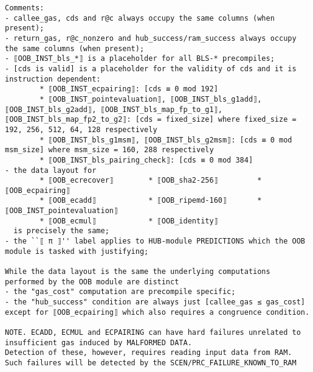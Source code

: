 \documentclass[varwidth=\maxdimen,margin=0.5cm,multi={verbatim}]{standalone}
\begin{document}
\begin{verbatim}
Comments: 
- callee_gas, cds and r@c always occupy the same columns (when present);
- return_gas, r@c_nonzero and hub_success/ram_success always occupy the same columns (when present);
- ⟦OOB_INST_bls_*⟧ is a placeholder for all BLS-* precompiles;
- [cds is valid] is a placeholder for the validity of cds and it is instruction dependent:
        * ⟦OOB_INST_ecpairing⟧: [cds ≡ 0 mod 192]
        * ⟦OOB_INST_pointevaluation⟧, ⟦OOB_INST_bls_g1add⟧, ⟦OOB_INST_bls_g2add⟧, ⟦OOB_INST_bls_map_fp_to_g1⟧, ⟦OOB_INST_bls_map_fp2_to_g2⟧: [cds = fixed_size] where fixed_size = 192, 256, 512, 64, 128 respectively  
        * ⟦OOB_INST_bls_g1msm⟧, ⟦OOB_INST_bls_g2msm⟧: [cds ≡ 0 mod msm_size] where msm_size = 160, 288 respectively
        * ⟦OOB_INST_bls_pairing_check⟧: [cds ≡ 0 mod 384]
- the data layout for
        * ⟦OOB_ecrecover⟧        * ⟦OOB_sha2-256⟧         * ⟦OOB_ecpairing⟧
        * ⟦OOB_ecadd⟧            * ⟦OOB_ripemd-160⟧       * ⟦OOB_INST_pointevaluation⟧           
        * ⟦OOB_ecmul⟧            * ⟦OOB_identity⟧
  is precisely the same;
- the ``⟦ π ⟧'' label applies to HUB-module PREDICTIONS which the OOB module is tasked with justifying;

While the data layout is the same the underlying computations performed by the OOB module are distinct
- the "gas_cost" computation are precompile specific;
- the "hub_success" condition are always just [callee_gas ≤ gas_cost] except for ⟦OOB_ecpairing⟧ which also requires a congruence condition.

NOTE. ECADD, ECMUL and ECPAIRING can have hard failures unrelated to insufficient gas induced by MALFORMED DATA.
Detection of these, however, requires reading input data from RAM. Such failures will be detected by the SCEN/PRC_FAILURE_KNOWN_TO_RAM 
\end{verbatim}
\end{document}
